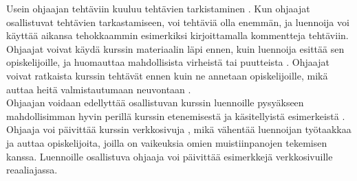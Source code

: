 \documentclass[finnish]{tktltiki2}
\theoremstyle{definition}
\theoremstyle{remark}
\begin{document}
Usein ohjaajan tehtäviin kuuluu tehtävien tarkistaminen \cite{Dickson11}. Kun ohjaajat osallistuvat tehtävien tarkastamiseen, voi tehtäviä olla enemmän, ja luennoija voi käyttää aikansa tehokkaammin esimerkiksi kirjoittamalla kommentteja tehtäviin. Ohjaajat voivat käydä kurssin materiaalin läpi ennen, kuin luennoija esittää sen opiskelijoille, ja huomauttaa mahdollisista virheistä tai puutteista \cite{Vikberg}. Ohjaajat voivat ratkaista kurssin tehtävät ennen kuin ne annetaan opiskelijoille, mikä auttaa heitä valmistautumaan neuvontaan \cite{Vihavainen}.
\\
Ohjaajan voidaan edellyttää osallistuvan kurssin luennoille pysyäkseen mahdollisimman hyvin perillä kurssin etenemisestä ja käsitellyistä esimerkeistä \cite{Reges03, Decker06}. Ohjaaja voi päivittää kurssin verkkosivuja \cite{Dickson11}, mikä vähentää luennoijan työtaakkaa ja auttaa opiskelijoita, joilla on vaikeuksia omien muistiinpanojen tekemisen kanssa. Luennoille osallistuva ohjaaja voi päivittää esimerkkejä verkkosivuille reaaliajassa.
\end{document}
